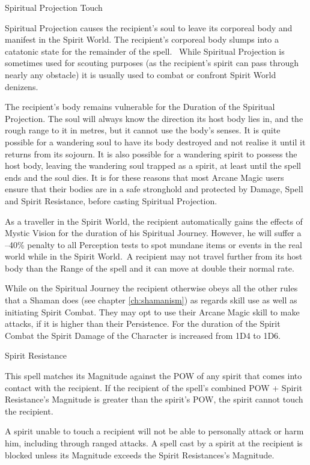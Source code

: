 \begin{rpg-spell}
{Spiritual Projection}
{Touch}

Spiritual Projection causes the recipient’s soul to leave its corporeal body and manifest in the Spirit World. The recipient’s corporeal body slumps into a catatonic state for the remainder of the spell.  While Spiritual Projection is sometimes used for scouting purposes (as the recipient’s spirit can pass through nearly any obstacle) it is usually used to combat or confront Spirit World denizens.

The recipient’s body remains vulnerable for the Duration of the Spiritual Projection. The soul will always know the direction its host body lies in, and the rough range to it in metres, but it cannot use the body’s senses. It is quite possible for a wandering soul to have its body destroyed and not realise it until it returns from its sojourn. It is also possible for a wandering spirit to possess the host body, leaving the wandering soul trapped as a spirit, at least until the spell ends and the soul dies. It is for these reasons that most Arcane Magic users ensure that their bodies are in a safe stronghold and protected by Damage, Spell and Spirit Resistance, before casting Spiritual Projection.

As a traveller in the Spirit World, the recipient automatically gains the effects of Mystic Vision for the duration of his Spiritual Journey. However, he will suffer a –40\% penalty to all Perception tests to spot mundane items or events in the real world while in the Spirit World. A recipient may not travel further from its host body than the Range of the spell and it can move at double their normal rate.

	While on the Spiritual Journey the recipient otherwise obeys all the other rules that a Shaman does (see chapter \ref{ch:shamanism}) as regards skill use as well as initiating Spirit Combat. They may opt to use their Arcane Magic skill to make attacks, if it is higher than their Persistence. For the duration of the Spirit Combat the Spirit Damage of the Character is increased from 1D4 to 1D6.
\end{rpg-spell}


\begin{rpg-spell}
{Spirit Resistance}
{}

This spell matches its Magnitude against the POW of any spirit that comes into contact with the recipient. If the recipient of the spell’s combined POW + Spirit Resistance’s Magnitude is greater than the spirit’s POW, the spirit cannot touch the recipient. 

A spirit unable to touch a recipient will not be able to personally attack or harm him, including through ranged attacks. A spell cast by a spirit at the recipient is blocked unless its Magnitude exceeds the Spirit Resistances’s Magnitude. 
\end{rpg-spell}


